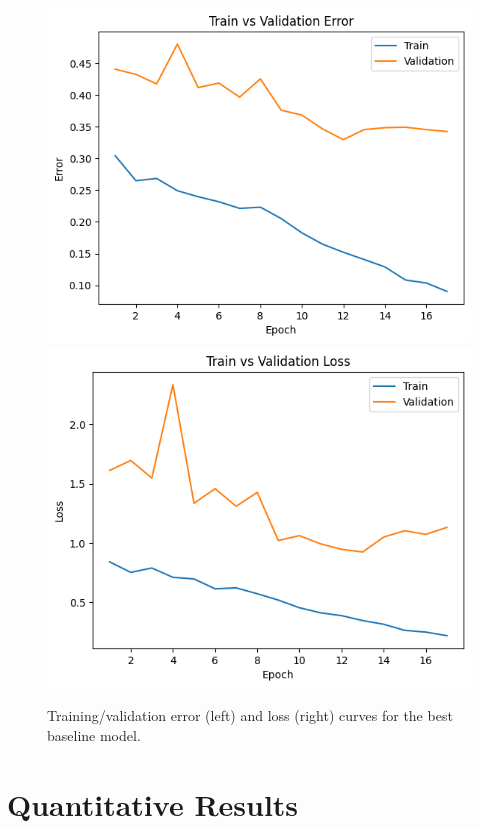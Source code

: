 \documentclass{article} %
\begin{document}
\begin{figure}[h]
    \begin{center}
        \includegraphics[scale=0.45]{figs/baseline_error_curves.png}
        \includegraphics[scale=0.45]{figs/baseline_loss_curves.png}
    \end{center}
    \caption{Training/validation error (left) and loss (right) curves for the best baseline model.}
    \label{fig:baseline_curves}
\end{figure}

\section{Quantitative Results}
\end{document}
